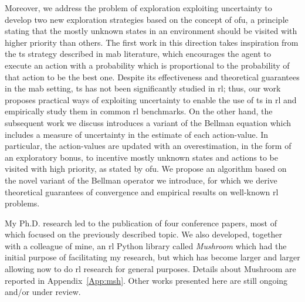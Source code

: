 Moreover, we address the problem of exploration exploiting uncertainty to develop two new exploration strategies based on the concept of \gls{ofu}, a principle stating that the mostly unknown states in an environment should be visited with higher priority than others. The first work in this direction takes inspiration from the \gls{ts} strategy described in \gls{mab} literature, which encourages the agent to execute an action with a probability which is proportional to the probability of that action to be the best one. Despite its effectiveness and theoretical guarantees in the \gls{mab} setting, \gls{ts} has not been significantly studied in \gls{rl}; thus, our work proposes practical ways of exploiting uncertainty to enable the use of \gls{ts} in \gls{rl} and empirically study them in common \gls{rl} benchmarks. On the other hand, the subsequent work we discuss introduces a variant of the Bellman equation which includes a measure of uncertainty in the estimate of each action-value. In particular, the action-values are updated with an overestimation, in the form of an exploratory bonus, to incentive mostly unknown states and actions to be visited with high priority, as stated by \gls{ofu}. We propose an algorithm based on the novel variant of the Bellman operator we introduce, for which we derive theoretical guarantees of convergence and empirical results on well-known \gls{rl} problems.

My Ph.D. research led to the publication of four conference papers, most of which focused on the previously described topic. We also developed, together with a colleague of mine, an \gls{rl} Python library called \textit{Mushroom} which had the initial purpose of facilitating my research, but which has become larger and larger allowing now to do \gls{rl} research for general purposes. Details about Mushroom are reported in Appendix~\ref{App:msh}. Other works presented here are still ongoing and/or under review.

